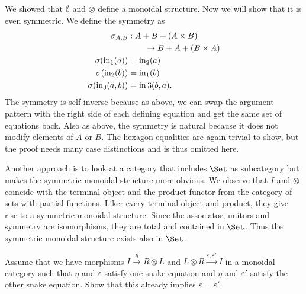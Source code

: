 \begin{answer}
  We showed that $\emptyset$ and $\otimes$ define a monoidal structure.
  Now we will show that it is even symmetric.
  We define the symmetry as
  \begin{align*}
    \sigma_{A, B} &: A + B + (A \times B) \\
      &\qquad\to B + A + (B \times A) \\
    \sigma(\operatorname{in}_1(a)) &= \operatorname{in}_2(a) \\
    \sigma(\operatorname{in}_2(b)) &= \operatorname{in}_1(b) \\
    \sigma(\operatorname{in}_3(a, b)) &= \operatorname{in}3(b, a).
  \end{align*}
  The symmetry is self-inverse because as above, we can swap the argument pattern with the right side of each defining equation and get the same set of equations back.
  Also as above, the symmetry is natural because it does not modify elements of $A$ or $B$.
  The hexagon equalities are again trivial to show, but the proof needs many case distinctions and is thus omitted here.

  Another approach is to look at a category that includes $\Set$ as subcategory but makes the symmetric monoidal structure more obvious.
  We observe that $I$ and $\otimes$ coincide with the terminal object and the product functor from the category of sets with partial functions.
  Liker every terminal object and product, they give rise to a symmetric monoidal structure.
  Since the associator, unitors and symmetry are isomorphisms, they are total and contained in $\Set$.
  Thus the symmetric monoidal structure exists also in $\Set$.
\end{answer}


\begin{exercise}
  Assume that we have morphisms $I \xrightarrow{\eta} R \otimes L$ and $L \otimes R \xrightarrow{\varepsilon, \varepsilon'} I$ in a monoidal category such that $\eta$ and $\varepsilon$ satisfy one snake equation and $\eta$ and $\varepsilon'$ satisfy the other snake equation.
  Show that this already implies $\varepsilon = \varepsilon'$.
\end{exercise}

